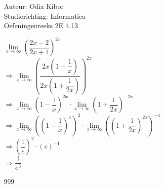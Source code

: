 \documentclass[a4paper]{article}
\begin{document}
  
\noindent \large Auteur: Odia Kibor \\
\noindent \large Studierichting: Informatica\\
\noindent \large Oefeningenreeks 2E 4.13 \\

\medskip

\normalsize

$\lim\limits_{x \rightarrow \infty} \left(\dfrac{2x-2}{2x+1}\right)^{2x}$ \\

$\Rightarrow \lim\limits_{x \rightarrow \infty} \left(\dfrac{2x\left(1-\dfrac{1}{x}\right)}{2x\left(1+\dfrac{1}{2x}\right)}\right)^{2x}$ \\

$\Rightarrow \lim\limits_{x \rightarrow \infty} \left(1-\dfrac{1}{x}\right)^{2x} \cdot \lim\limits_{x \rightarrow \infty} \left(1+\dfrac{1}{2x}\right)^{-2x}$\\

$\Rightarrow \lim\limits_{x \rightarrow \infty} \left(\left(1-\dfrac{1}{x}\right)^{x}\right)^{2} \cdot \lim\limits_{x \rightarrow \infty} \left(\left(1+\dfrac{1}{2x}\right)^{2x}\right)^{-1}$ \\

$\Rightarrow \left(\dfrac{1}{e}\right)^{2} \cdot \left(e\right)^{-1}$ \\

$\Rightarrow \dfrac{1}{e^3}$ \\


\begin{thebibliography}{999}
\end{thebibliography}
\end{document}
